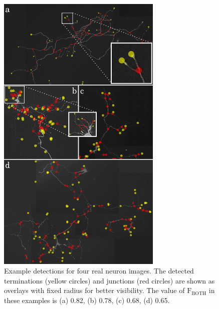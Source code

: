 \begin{figure}
	\centering
	\includegraphics[width=0.7\textwidth,height=0.7\textheight,keepaspectratio]{det_real}
	\caption{Example detections for four real neuron images. The detected terminations (yellow circles) and junctions (red circles) are shown as overlays with fixed radius for better visibility. The value of $\textrm{F}_\textrm{BOTH}$ in these examples is (a) 0.82, (b) 0.78, (c) 0.68, (d) 0.65.}
	\label{ch2_fig18}
\end{figure}
